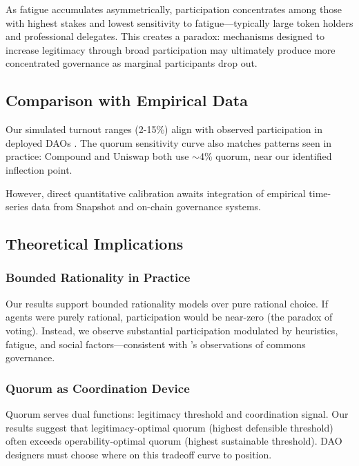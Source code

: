 As fatigue accumulates asymmetrically, participation concentrates among those with highest stakes and lowest sensitivity to fatigue---typically large token holders and professional delegates. This creates a paradox: mechanisms designed to increase legitimacy through broad participation may ultimately produce more concentrated governance as marginal participants drop out.

\subsection{Comparison with Empirical Data}

Our simulated turnout ranges (2-15\%) align with observed participation in deployed DAOs \citep{deepdao2023analytics}. The quorum sensitivity curve also matches patterns seen in practice: Compound and Uniswap both use $\sim$4\% quorum, near our identified inflection point.

However, direct quantitative calibration awaits integration of empirical time-series data from Snapshot and on-chain governance systems.

\subsection{Theoretical Implications}

\subsubsection{Bounded Rationality in Practice}

Our results support bounded rationality models over pure rational choice. If agents were purely rational, participation would be near-zero (the paradox of voting). Instead, we observe substantial participation modulated by heuristics, fatigue, and social factors---consistent with \citet{ostrom1990governing}'s observations of commons governance.

\subsubsection{Quorum as Coordination Device}

Quorum serves dual functions: legitimacy threshold and coordination signal. Our results suggest that legitimacy-optimal quorum (highest defensible threshold) often exceeds operability-optimal quorum (highest sustainable threshold). DAO designers must choose where on this tradeoff curve to position.


